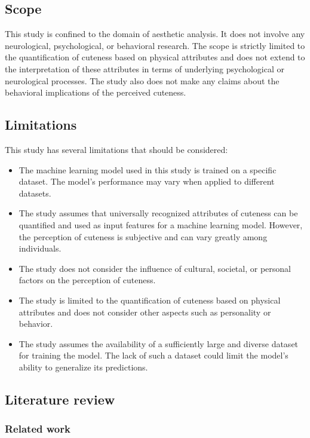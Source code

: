 \documentclass{article}
\begin{document}
\subsection{Scope}
This study is confined to the domain of aesthetic analysis. It does not involve any neurological, psychological, or behavioral research. The scope is strictly limited to the quantification of cuteness based on physical attributes and does not extend to the interpretation of these attributes in terms of underlying psychological or neurological processes. The study also does not make any claims about the behavioral implications of the perceived cuteness.

\subsection{Limitations}
This study has several limitations that should be considered:

\begin{itemize}
    \item The machine learning model used in this study is trained on a specific dataset. The model's performance may vary when applied to different datasets.
    \item The study assumes that universally recognized attributes of cuteness can be quantified and used as input features for a machine learning model. However, the perception of cuteness is subjective and can vary greatly among individuals.
    \item The study does not consider the influence of cultural, societal, or personal factors on the perception of cuteness.
    \item The study is limited to the quantification of cuteness based on physical attributes and does not consider other aspects such as personality or behavior.
    \item The study assumes the availability of a sufficiently large and diverse dataset for training the model. The lack of such a dataset could limit the model's ability to generalize its predictions.
\end{itemize}

\subsection{Literature review}
\subsubsection{Related work}




\printbibliography
\end{document}
